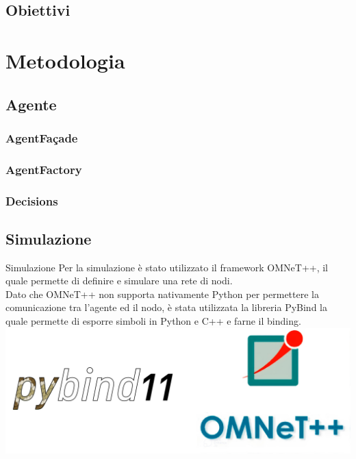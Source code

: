 \documentclass[compress]{beamer}
\begin{document}
\subsection*{Obiettivi}

\section*{Metodologia}

\subsection*{Agente}

\subsubsection*{AgentFaçade}

\subsubsection*{AgentFactory}

\subsubsection*{Decisions}

\subsection*{Simulazione}
\begin{frame}{Simulazione}
    Per la simulazione è stato utilizzato il framework OMNeT++, il quale permette di definire e simulare una rete di nodi. \\Dato che OMNeT++ non supporta nativamente Python per permettere la comunicazione tra l'agente ed il nodo, è stata utilizzata la libreria PyBind la quale permette di esporre simboli in Python e C++ e farne il binding.
    \begin{adjustbox}{margin=0cm 0cm 0cm 0.5cm, center} %
        \includegraphics[width=.8\textwidth]{figs/pybind_omnet.png}
    \end{adjustbox}
\end{frame}
\end{document}
